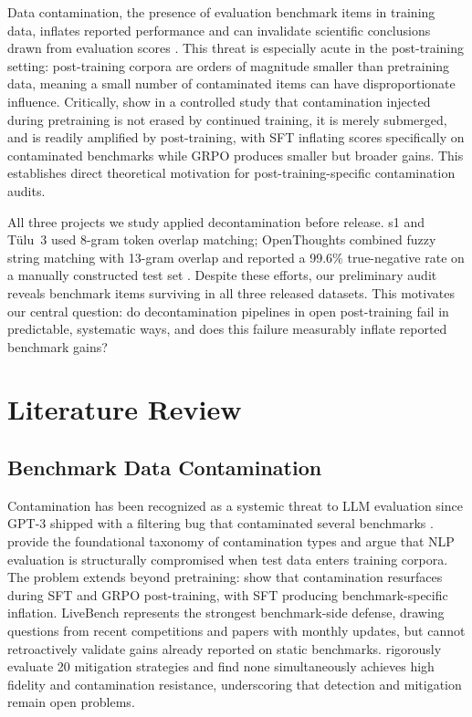 \documentclass{article} %
\begin{document}
Data contamination, the presence of evaluation benchmark items in training data, inflates reported performance and can invalidate scientific conclusions drawn from evaluation scores \citep{sainz2023nlp}. This threat is especially acute in the post-training setting: post-training corpora are orders of magnitude smaller than pretraining data, meaning a small number of contaminated items can have disproportionate influence. Critically, \citet{kocyigit2025posttraining} show in a controlled study that contamination injected during pretraining is not erased by continued training, it is merely submerged, and is readily amplified by post-training, with SFT inflating scores specifically on contaminated benchmarks while GRPO produces smaller but broader gains. This establishes direct theoretical motivation for post-training-specific contamination audits.

All three projects we study applied decontamination before release. s1 and T\"ulu~3 used 8-gram token overlap matching; OpenThoughts combined fuzzy string matching with 13-gram overlap and reported a 99.6\% true-negative rate on a manually constructed test set \citep{openthoughts2025}. Despite these efforts, our preliminary audit reveals benchmark items surviving in all three released datasets. This motivates our central question: do decontamination pipelines in open post-training fail in predictable, systematic ways, and does this failure measurably inflate reported benchmark gains?

\section{Literature Review}

\subsection{Benchmark Data Contamination}

Contamination has been recognized as a systemic threat to LLM evaluation since GPT-3 shipped with a filtering bug that contaminated several benchmarks \citep{brown2020gpt3}. \citet{sainz2023nlp} provide the foundational taxonomy of contamination types and argue that NLP evaluation is structurally compromised when test data enters training corpora. The problem extends beyond pretraining: \citet{kocyigit2025posttraining} show that contamination resurfaces during SFT and GRPO post-training, with SFT producing benchmark-specific inflation. LiveBench \citep{white2025livebench} represents the strongest benchmark-side defense, drawing questions from recent competitions and papers with monthly updates, but cannot retroactively validate gains already reported on static benchmarks. \citet{sun2025mitigation} rigorously evaluate 20 mitigation strategies and find none simultaneously achieves high fidelity and contamination resistance, underscoring that detection and mitigation remain open problems.
\end{document}
